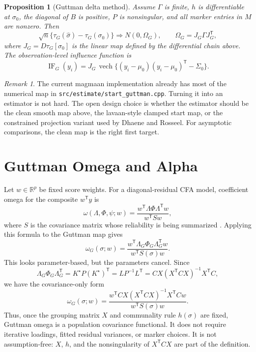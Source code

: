 \documentclass[11pt]{article}
\newcommand{\T}{^{\mathsf T}}
\newcommand{\vech}{\operatorname{vech}}
\newcommand{\IF}{\operatorname{IF}}
\theoremstyle{plain}
\newtheorem{proposition}{Proposition}
\theoremstyle{remark}
\newtheorem*{remark}{Remark}
\begin{document}
\begin{proposition}[Guttman delta method]\label{prop:guttman}
Assume \(\Gamma\) is finite, \(h\) is differentiable at \(\sigma_0\), the
diagonal of \(B\) is positive, \(P\) is nonsingular, and all marker entries in
\(M\) are nonzero. Then
\[
  \sqrt n\{\tau_G(\hat\sigma)-\tau_G(\sigma_0)\}
    \Rightarrow
  N(0,\Omega_G),
  \qquad
  \Omega_G=J_G\Gamma J_G\T,
\]
where \(J_G=D\tau_G[\sigma_0]\) is the linear map defined by the differential
chain above. The observation-level influence function is
\[
  \IF_G(y_i)=J_G\,\vech\{(y_i-\mu_0)(y_i-\mu_0)\T-\Sigma_0\}.
\]
\end{proposition}

\begin{remark}
The current magmaan implementation already has most of the numerical map in
\texttt{src/estimate/start\_guttman.cpp}. Turning it into an estimator is not
hard. The open design choice is whether the estimator should be the clean
smooth map above, the lavaan-style clamped start map, or the constrained
projection variant used by Dhaene and Rosseel. For asymptotic comparisons, the
clean map is the right first target.
\end{remark}

\section{Guttman Omega and Alpha}

Let \(w\in\mathbb{R}^p\) be fixed score weights. For a diagonal-residual CFA
model, coefficient omega for the composite \(w\T y\) is
\[
  \omega(\Lambda,\Phi,\psi;w)
    =
  \frac{w\T\Lambda\Phi\Lambda\T w}{w\T S w},
\]
where \(S\) is the covariance matrix whose reliability is being summarized
\cite{mcdonald1999}. Applying this formula to the Guttman map gives
\[
  \omega_G(\sigma;w)
    =
  \frac{w\T\Lambda_G\Phi_G\Lambda_G\T w}{w\T S(\sigma) w}.
\]
This looks parameter-based, but the parameters cancel. Since
\[
  \Lambda_G\Phi_G\Lambda_G\T
    =
  K^\star P (K^\star)\T
    =
  L P^{-1}L\T
    =
  C X(X\T C X)^{-1}X\T C,
\]
we have the covariance-only form
\begin{equation}\label{eq:guttman-omega-general}
  \omega_G(\sigma;w)
    =
  \frac{
    w\T C X(X\T C X)^{-1}X\T C w
  }{
    w\T S(\sigma)w
  }.
\end{equation}
Thus, once the grouping matrix \(X\) and communality rule \(h(\sigma)\) are
fixed, Guttman omega is a population covariance functional. It does not require
iterative loadings, fitted residual variances, or marker choices. It is not
assumption-free: \(X\), \(h\), and the nonsingularity of \(X\T C X\) are part of
the definition.
\end{document}
